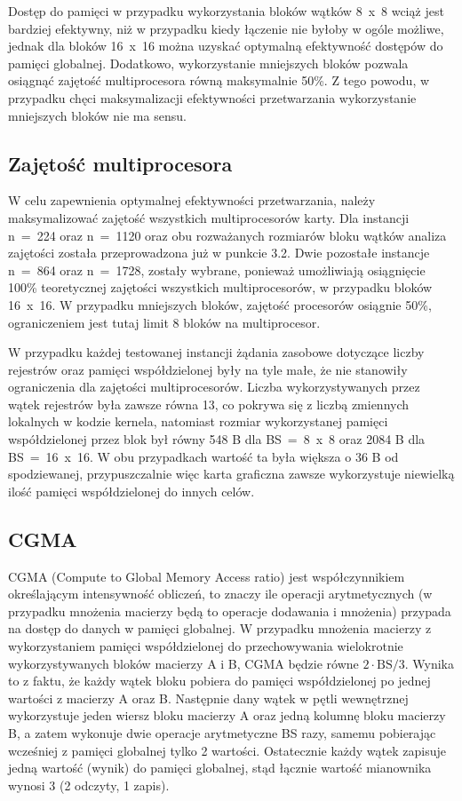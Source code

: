 \documentclass[12pt,a4paper]{article}
\begin{document}
Dostęp do pamięci w przypadku wykorzystania bloków wątków 8~x~8 wciąż jest bardziej efektywny, niż w przypadku kiedy łączenie nie byłoby w ogóle możliwe, jednak dla bloków 16~x~16 można uzyskać optymalną efektywność dostępów do pamięci globalnej. Dodatkowo, wykorzystanie mniejszych bloków pozwala osiągnąć zajętość multiprocesora równą maksymalnie 50\%. Z tego powodu, w przypadku chęci maksymalizacji efektywności przetwarzania wykorzystanie mniejszych bloków nie ma sensu.

\subsection{Zajętość multiprocesora}

W celu zapewnienia optymalnej efektywności przetwarzania, należy maksymalizować zajętość wszystkich multiprocesorów karty. Dla instancji n~=~224 oraz n~=~1120 oraz obu rozważanych rozmiarów bloku wątków analiza zajętości została przeprowadzona już w punkcie 3.2. Dwie pozostałe instancje n~=~864 oraz n~=~1728, zostały wybrane, ponieważ umożliwiają osiągnięcie  100\% teoretycznej zajętości wszystkich multiprocesorów, w przypadku bloków 16~x~16. W przypadku mniejszych bloków, zajętość procesorów osiągnie 50\%, ograniczeniem jest tutaj limit 8 bloków na multiprocesor.

W przypadku każdej testowanej instancji żądania zasobowe dotyczące liczby rejestrów oraz pamięci współdzielonej były na tyle małe, że nie stanowiły ograniczenia dla zajętości multiprocesorów. Liczba wykorzystywanych przez wątek rejestrów była zawsze równa 13, co pokrywa się z liczbą zmiennych lokalnych w kodzie kernela, natomiast rozmiar wykorzystanej pamięci współdzielonej przez blok był równy 548 B dla BS~=~8~x~8 oraz 2084 B dla BS~=~16~x~16. W obu przypadkach wartość ta była większa o 36 B od spodziewanej, przypuszczalnie więc karta graficzna zawsze wykorzystuje niewielką ilość pamięci współdzielonej do innych celów.

\subsection{CGMA}

CGMA (Compute to Global Memory Access ratio) jest współczynnikiem określającym intensywność obliczeń, to znaczy ile operacji arytmetycznych (w przypadku mnożenia macierzy będą to operacje dodawania i mnożenia) przypada na dostęp do danych w pamięci globalnej. W przypadku mnożenia macierzy z wykorzystaniem pamięci współdzielonej do przechowywania wielokrotnie wykorzystywanych bloków macierzy A i B, CGMA będzie równe $2 \cdot \text{BS} / 3$. Wynika to z faktu, że każdy wątek bloku pobiera do pamięci współdzielonej po jednej wartości z macierzy A oraz B. Następnie dany wątek w pętli wewnętrznej wykorzystuje jeden wiersz bloku macierzy A oraz jedną kolumnę bloku macierzy B, a zatem wykonuje dwie operacje arytmetyczne BS razy, samemu pobierając wcześniej z pamięci globalnej tylko 2 wartości. Ostatecznie każdy wątek zapisuje jedną wartość (wynik) do pamięci globalnej, stąd łącznie wartość mianownika wynosi 3 (2 odczyty, 1 zapis).
\end{document}
